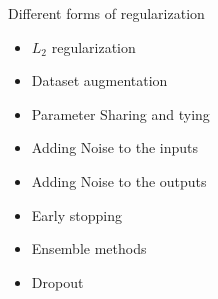 \begin{frame}
	\vspace{4em}
	\begin{overlayarea}{\textwidth}{\textheight}
		\begin{block}{Different forms of regularization}
			\begin{itemize}
				\item<1-> $L_2$ regularization
				\item<2-> Dataset augmentation
				\item<3-> Parameter Sharing and tying
				\item<4-> Adding Noise to the inputs 
				\item<5-> Adding Noise to the outputs
				\item<6-> Early stopping
				\item<7-> Ensemble methods
				\item<8-> Dropout
			\end{itemize}
		\end{block}
	\end{overlayarea}
\end{frame}
